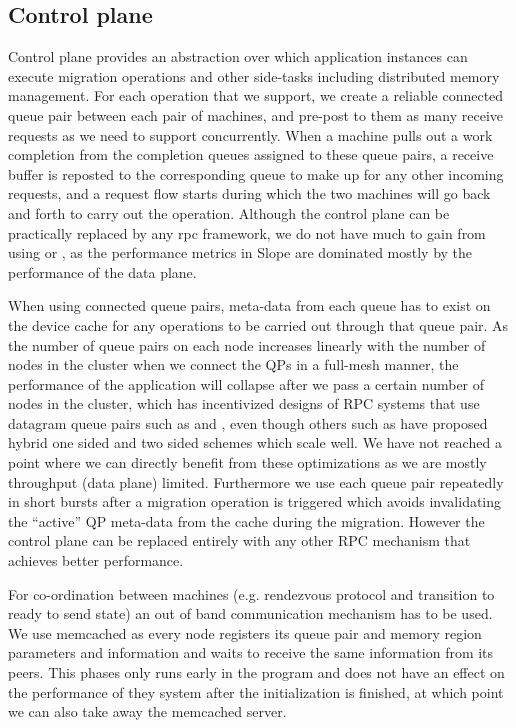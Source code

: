 \subsection{Control plane}
Control plane provides an abstraction over which application instances can
execute migration operations and other side-tasks including distributed
memory management. For each operation that we support, we create a reliable
connected queue pair between each pair of machines, and pre-post to them
as many receive requests as we need to support concurrently. When a
machine pulls out a work completion from the completion queues assigned to
these queue pairs, a receive buffer is reposted to the corresponding queue to
make up for any other incoming requests, and a request flow starts during which
the two machines will go back and forth to carry out the operation. Although
the control plane can be practically replaced by any rpc framework, we do not
have much to gain from using \cite{kalia2016designguidelines} or
\cite{kalia2016fasst}, as the performance metrics in Slope are dominated mostly
by the performance of the data plane.

When using connected queue pairs, meta-data
from each queue has to exist on the device cache for any operations to be
carried out through that queue pair. As the number of queue pairs on each node
increases linearly with the number of nodes in the cluster when we connect the
QPs in a full-mesh manner, the performance of the application will collapse
after we pass a certain number of nodes in the cluster, which has
incentivized designs of RPC systems that use datagram queue pairs such as
\cite{kalia2019datacenter} and \cite{kalia2016fasst}, even though others such
as \cite{novakovic2019storm} have proposed hybrid one sided and two sided
schemes which scale well. We have not reached a point where we can directly
benefit from these optimizations as we are mostly throughput (data plane)
limited. Furthermore we use each queue pair repeatedly in short bursts after a
migration operation is triggered which avoids invalidating the ``active'' QP
meta-data from the cache during the migration. However the control plane
can be replaced entirely with any other RPC mechanism that achieves better
performance.

For co-ordination between machines (e.g. rendezvous protocol and transition
to ready to send state)
an out of band communication mechanism has to be used. We use memcached as
every node registers its queue pair and memory region parameters and
information and waits to receive the same information from its peers. This
phases only runs early in the program and does not have an effect on the
performance of they system after the initialization is finished, at which point
we can also take away the memcached server.

